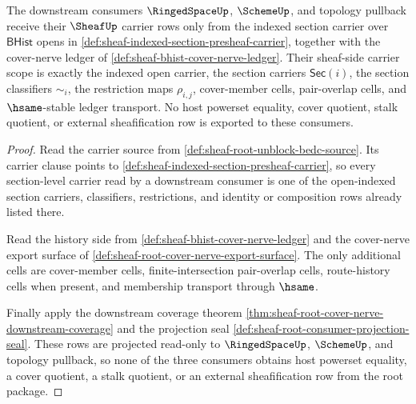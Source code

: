 \begin{theorem}
\label{thm:sheaf-root-downstream-consumer-carrier-scope}
The downstream consumers $\RingedSpaceUp$, $\SchemeUp$, and topology pullback receive their $\SheafUp$ carrier rows only from the indexed section carrier over $\mathsf{BHist}$ opens in \autoref{def:sheaf-indexed-section-presheaf-carrier}, together with the cover-nerve ledger of \autoref{def:sheaf-bhist-cover-nerve-ledger}. Their sheaf-side carrier scope is exactly the indexed open carrier, the section carriers $\mathsf{Sec}(i)$, the section classifiers $\sim_i$, the restriction maps $\rho_{i,j}$, cover-member cells, pair-overlap cells, and $\hsame$-stable ledger transport. No host powerset equality, cover quotient, stalk quotient, or external sheafification row is exported to these consumers.
\end{theorem}
\begin{proof}
Read the carrier source from \autoref{def:sheaf-root-unblock-bedc-source}. Its carrier clause points to \autoref{def:sheaf-indexed-section-presheaf-carrier}, so every section-level carrier read by a downstream consumer is one of the open-indexed section carriers, classifiers, restrictions, and identity or composition rows already listed there.

Read the history side from \autoref{def:sheaf-bhist-cover-nerve-ledger} and the cover-nerve export surface of \autoref{def:sheaf-root-cover-nerve-export-surface}. The only additional cells are cover-member cells, finite-intersection pair-overlap cells, route-history cells when present, and membership transport through $\hsame$.

Finally apply the downstream coverage theorem \autoref{thm:sheaf-root-cover-nerve-downstream-coverage} and the projection seal \autoref{def:sheaf-root-consumer-projection-seal}. These rows are projected read-only to $\RingedSpaceUp$, $\SchemeUp$, and topology pullback, so none of the three consumers obtains host powerset equality, a cover quotient, a stalk quotient, or an external sheafification row from the root package.
\end{proof}

